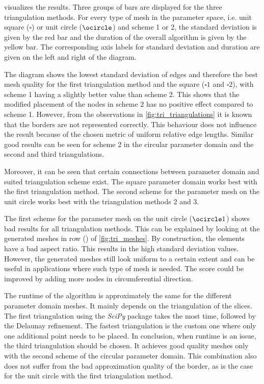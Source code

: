  visualizes the results. Three groups of bars are displayed for the three triangulation methods. For every type of mesh in the parameter space, i.e. unit square ($\square$) or unit circle ($\ocircle$) and scheme 1 or 2, the standard deviation is given by the red bar and the duration of the overall algorithm is given by the yellow bar. The corresponding axis labels for standard deviation and duration are given on the left and right of the diagram.

The diagram shows the lowest standard deviation of edges and therefore the best mesh quality for the first triangulation method and the square ($\square 1$ and $\square 2$), with scheme 1 having a slightly better value than scheme 2. This shows that the modified placement of the nodes in scheme 2 has no positive effect compared to scheme 1.
However, from the observations in \cref{fig:tri_triangulations} it is known that the borders are not represented correctly.
This behaviour does not influence the result because of the chosen metric of uniform relative edge lengths.
Similar good results can be seen for scheme 2 in the circular parameter domain and the second and third triangulations.

Moreover, it can be seen that certain connections between parameter domain and suited triangulation scheme exist. The square parameter domain works best with the first triangulation method. The second scheme for the parameter mesh on the unit circle works best with the triangulation methods 2 and 3.

The first scheme for the parameter mesh on the unit circle ($\ocircle 1$) shows bad results for all triangulation methods. This can be explained by looking at the generated meshes in row () of \cref{fig:tri_meshes}. By construction, the elements have a bad aspect ratio. This results in the high standard deviation values. However, the generated meshes still look uniform to a certain extent and can be useful in applications where such type of mesh is needed. The score could be improved by adding more nodes in circumferential direction.

The runtime of the algorithm is approximately the same for the different parameter domain meshes. It mainly depends on the triangulation of the slices. The first triangulation using the \emph{SciPy} package takes the most time, followed by the Delaunay refinement. The fastest triangulation is the custom one where only one additional point needs to be placed. In conclusion, when runtime is an issue, the third triangulation should be chosen. It achieves good quality meshes only with the second scheme of the circular parameter domain. This combination also does not suffer from the bad approximation quality of the border, as is the case for the unit circle with the first triangulation method.

